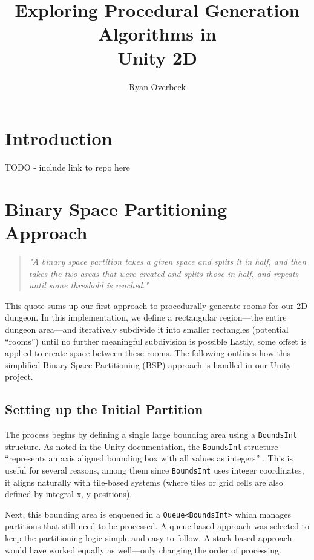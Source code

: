 \documentclass[a4paper, 12pt, one column, aas_macros]{article}
\title{Exploring Procedural Generation Algorithms in \\Unity 2D}
\author{Ryan Overbeck}
\begin{document}
\maketitle


\tableofcontents


\section{Introduction}
TODO - include link to repo here

\section{Binary Space Partitioning Approach}
\begin{quote}
  \emph{"A binary space partition takes a given space and splits it in half, and then takes the two areas that were created and splits those in half, and repeats until some threshold is reached."}
  \cite[p.~293]{ShortAdams2017}
\end{quote}

This quote sums up our first approach to procedurally generate rooms for our 2D dungeon. In this implementation, we define a rectangular region---the entire dungeon area---and iteratively subdivide it into smaller rectangles (potential ``rooms'') until no further meaningful subdivision is possible Lastly, some offset is applied to create space between these rooms. The following outlines how this simplified Binary Space Partitioning (BSP) approach is handled in our Unity project.

\subsection{Setting up the Initial Partition}
The process begins by defining a single large bounding area using a \texttt{BoundsInt} structure. As noted in the Unity documentation, the \texttt{BoundsInt} structure ``represents an axis aligned bounding box with all values as integers'' \citep{unity_docs}. This is useful for several reasons, among them since \texttt{BoundsInt} uses integer coordinates, it aligns naturally with tile-based systems (where tiles or grid cells are also defined by integral x, y positions).

Next, this bounding area is enqueued in a \texttt{Queue<BoundsInt>} which manages partitions that still need to be processed. A queue-based approach was selected to keep the partitioning logic simple and easy to follow. A stack-based approach would have worked equally as well---only changing the order of processing.
\end{document}
